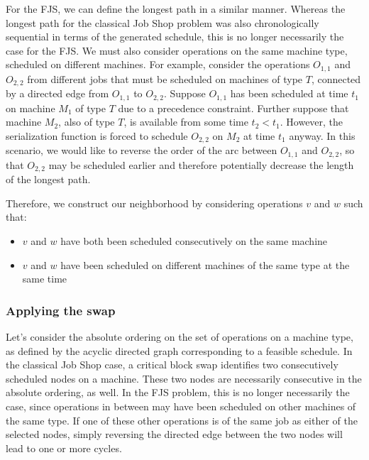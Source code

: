 \documentclass[a4paper,10pt]{article}
\begin{document}
For the FJS, we can define the longest path in a similar manner. Whereas the longest path for the classical Job Shop problem was also chronologically sequential in terms of the generated schedule, this is no longer necessarily the case for the FJS. We must also consider operations on the same machine type, scheduled on different machines. For example, consider the operations $O_{1,1}$ and $O_{2,2}$ from different jobs that must be scheduled on machines of type $T$, connected by a directed edge from $O_{1,1}$ to $O_{2,2}$. Suppose $O_{1,1}$ has been scheduled at time $t_1$ on machine $M_1$ of type $T$ due to a precedence constraint. Further suppose that machine $M_2$, also of type $T$, is available from some time $t_2 < t_1$. However, the serialization function is forced to schedule $O_{2,2}$ on $M_2$ at time $t_1$ anyway. In this scenario, we would like to reverse the order of the arc between $O_{1,1}$ and $O_{2,2}$, so that $O_{2,2}$ may be scheduled earlier and therefore potentially decrease the length of the longest path.

Therefore, we construct our neighborhood by considering operations $v$ and $w$ such that:

\begin{itemize}
	\item $v$ and $w$ have both been scheduled consecutively on the same machine
	\item $v$ and $w$ have been scheduled on different machines of the same type at the same time
\end{itemize}

\subsubsection{Applying the swap}

Let's consider the absolute ordering on the set of operations on a machine type, as defined by the acyclic directed graph corresponding to a feasible schedule. In the classical Job Shop case, a critical block swap identifies two consecutively scheduled nodes on a machine. These two nodes are necessarily consecutive in the absolute ordering, as well. In the FJS problem, this is no longer necessarily the case, since operations in between may have been scheduled on other machines of the same type. If one of these other operations is of the same job as either of the selected nodes, simply reversing the directed edge between the two nodes will lead to one or more cycles.
\end{document}
